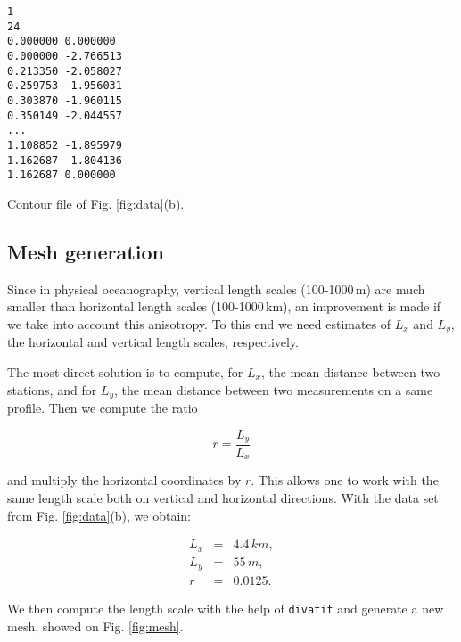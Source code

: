 \begin{exfile}
\begin{footnotesize}
\begin{verbatim}
1 
24 
0.000000 0.000000 
0.000000 -2.766513 
0.213350 -2.058027 
0.259753 -1.956031 
0.303870 -1.960115 
0.350149 -2.044557 
...
1.108852 -1.895979 
1.162687 -1.804136 
1.162687 0.000000 

\end{verbatim}
\end{footnotesize}
\caption{Contour file of Fig. \ref{fig:data}(b).\label{exfile:contour}}
\end{exfile}


\subsection{Mesh generation\label{sec:meshscale}}



Since in physical oceanography, vertical length scales (100-1000\,m) are much smaller than horizontal length scales (100-1000\,km), an improvement is  made if we take into account this anisotropy. To this end we need estimates of $L_{x}$ and $L_{y}$, the horizontal and vertical length scales, respectively.


The most direct solution is to compute, for $L_{x}$, the mean distance between two stations, and for $L_{y}$, the mean distance between two measurements on a same profile. Then we compute the ratio

\[r = \frac{L_y}{L_x}\]

and multiply the horizontal coordinates by $r$. This allows one to work with the same length scale both on vertical and horizontal directions. With the  data set from Fig. \ref{fig:data}(b), we obtain:

\begin{eqnarray*}
L_{x} &=& 4.4\,km,\\
L_{y} &=& 55\,m,\\
	r   &=& 0.0125.
\end{eqnarray*}




We then compute the length scale with the help of \texttt{divafit} and generate a new mesh, showed on Fig. \ref{fig:mesh}. 

